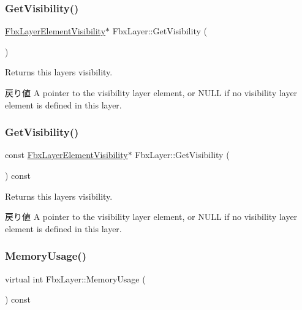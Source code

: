 \subsubsection{\texorpdfstring{Get\+Visibility()}{GetVisibility()}\hspace{0.1cm}{\footnotesize\ttfamily [1/2]}}
{\footnotesize\ttfamily \hyperlink{class_fbx_layer_element_visibility}{Fbx\+Layer\+Element\+Visibility}$\ast$ Fbx\+Layer\+::\+Get\+Visibility (\begin{DoxyParamCaption}{ }\end{DoxyParamCaption})}

Returns this layer\textquotesingle{}s visibility. \begin{DoxyReturn}{戻り値}
A pointer to the visibility layer element, or {\ttfamily N\+U\+LL} if no visibility layer element is defined in this layer. 
\end{DoxyReturn}
\mbox{\label{class_fbx_layer_ad87b993616dc534df4b90e0606918302}} 
\subsubsection{\texorpdfstring{Get\+Visibility()}{GetVisibility()}\hspace{0.1cm}{\footnotesize\ttfamily [2/2]}}
{\footnotesize\ttfamily const \hyperlink{class_fbx_layer_element_visibility}{Fbx\+Layer\+Element\+Visibility}$\ast$ Fbx\+Layer\+::\+Get\+Visibility (\begin{DoxyParamCaption}{ }\end{DoxyParamCaption}) const}

Returns this layer\textquotesingle{}s visibility. \begin{DoxyReturn}{戻り値}
A pointer to the visibility layer element, or {\ttfamily N\+U\+LL} if no visibility layer element is defined in this layer. 
\end{DoxyReturn}
\mbox{\label{class_fbx_layer_a7408d4032e3aa5f880ccc58e4956fd6c}} 
\subsubsection{\texorpdfstring{Memory\+Usage()}{MemoryUsage()}}
{\footnotesize\ttfamily virtual int Fbx\+Layer\+::\+Memory\+Usage (\begin{DoxyParamCaption}{ }\end{DoxyParamCaption}) const\hspace{0.3cm}{\ttfamily [virtual]}}


